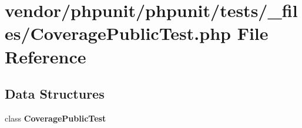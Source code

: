 \section{vendor/phpunit/phpunit/tests/\+\_\+files/\+Coverage\+Public\+Test.php File Reference}
\label{phpunit_2tests_2__files_2_coverage_public_test_8php}
\subsection*{Data Structures}
\begin{DoxyCompactItemize}
\item 
class {\bf Coverage\+Public\+Test}
\end{DoxyCompactItemize}
